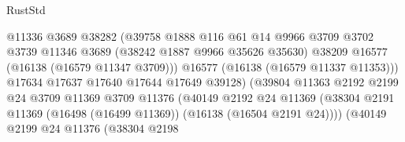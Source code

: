 \begin{lexlean}{RustStd}
\begin{coremodule}
                                            @11336
                                            @3689
                                            @38282
                                            (@39758
                                              @1888
                                              @116
                                              @61
                                              @14
                                              @9966
                                              @3709
                                              @3702
                                              @3739
                                              @11346
                                              @3689
                                              (@38242 @1887 @9966 @35626 @35630)
                                              @38209
                                              @16577
                                              (@16138 (@16579 @11347 @3709)))
                                            @16577
                                            (@16138 (@16579 @11337 @11353)))
                                          @17634
                                          @17637
                                          @17640
                                          @17644
                                          @17649
                                          @39128)
                                        (@39804
                                          @11363
                                          @2192
                                          @2199
                                          @24
                                          @3709
                                          @11369
                                          @3709
                                          @11376
                                          (@40149
                                            @2192
                                            @24
                                            @11369
                                            (@38304
                                              @2191
                                              @11369
                                              (@16498 (@16499 @11369))
                                              (@16138 (@16504 @2191 @24))))
                                          (@40149
                                            @2199
                                            @24
                                            @11376
                                            (@38304
                                              @2198

\end{coremodule}
\end{lexlean}
